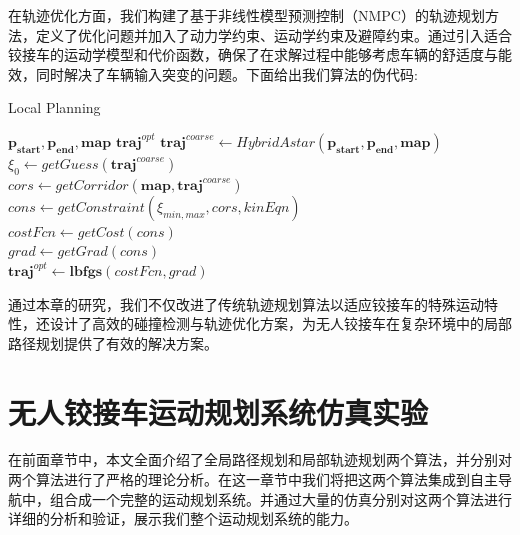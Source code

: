 \documentclass[master,academic]{ysuthesis} %
\begin{document}
	在轨迹优化方面，我们构建了基于非线性模型预测控制（NMPC）的轨迹规划方法，定义了优化问题并加入了动力学约束、运动学约束及避障约束。通过引入适合铰接车的运动学模型和代价函数，确保了在求解过程中能够考虑车辆的舒适度与能效，同时解决了车辆输入突变的问题。下面给出我们算法的伪代码:
	\begin{algorithm}[H]  
		\caption{Local Planning}  
		\label{alg:local_planning}  
		\begin{algorithmic}[1]  
			\REQUIRE  
			$\mathbf{p_{start}},\mathbf{p_{end}},\mathbf{map}$
			\ENSURE  
			$\mathbf{traj}^{opt}$
			\STATE $\mathbf{traj}^{coarse} \leftarrow HybridAstar(\mathbf{p_{start}},\mathbf{p_{end}},\mathbf{map})$\\
			\STATE $\xi_0 \leftarrow getGuess(\mathbf{traj}^{coarse})$\\
			\STATE $cors \leftarrow getCorridor(\mathbf{map},\mathbf{traj}^{coarse})$\\
			\STATE $cons \leftarrow getConstraint(\xi_{min,max},cors,kinEqn)$\\
			\STATE $costFcn \leftarrow getCost(cons)$\\
			\STATE $grad \leftarrow getGrad(cons)$ \\
		   \RETURN $\mathbf{traj}^{opt} \leftarrow \mathbf{lbfgs}(costFcn,grad)$
		\end{algorithmic}  
	\end{algorithm}

	通过本章的研究，我们不仅改进了传统轨迹规划算法以适应铰接车的特殊运动特性，还设计了高效的碰撞检测与轨迹优化方案，为无人铰接车在复杂环境中的局部路径规划提供了有效的解决方案。
	
	\chapter{无人铰接车运动规划系统仿真实验}
	在前面章节中，本文全面介绍了全局路径规划和局部轨迹规划两个算法，并分别对两个算法进行了严格的理论分析。在这一章节中我们将把这两个算法集成到自主导航中，组合成一个完整的运动规划系统。并通过大量的仿真分别对这两个算法进行详细的分析和验证，展示我们整个运动规划系统的能力。
	
\end{document}

